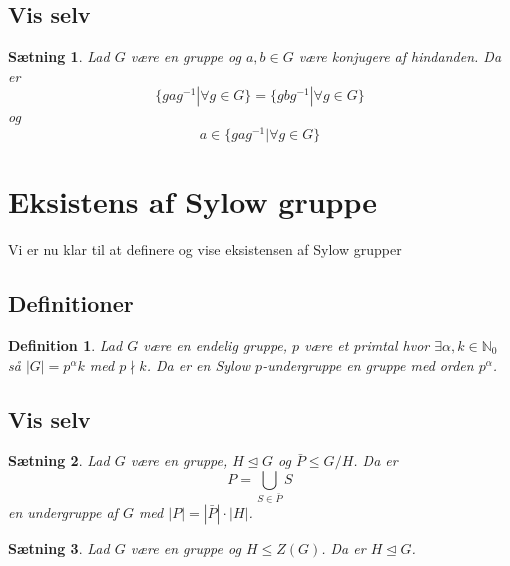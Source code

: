 \documentclass{article}
\newcommand{\N}{\mathbb{N}}
\newcommand{\inv}{^{-1}}
\newtheorem{setn}{Sætning}
\newtheorem{defi}{Definition}
\begin{document}
		\subsection*{Vis selv}
		\begin{setn} \label{KonjPar}
			Lad $G$ være en gruppe og $a,b \in G$ være konjugere af hindanden.
			Da er
			$$\{gag\inv | \forall g \in G\} = \{gbg\inv | \forall g \in G\}$$
			og
			$$a \in \{gag\inv | \forall g \in G\}$$
		\end{setn}
	\newpage
	\section*{Eksistens af Sylow gruppe}
		Vi er nu klar til at definere og vise eksistensen af Sylow grupper
		\subsection*{Definitioner}
		\begin{defi}
			Lad $G$ være en endelig gruppe, $p$ være et primtal hvor $\exists \alpha,k \in \N_0$ så
			$|G| = p^\alpha k$ med $p \nmid k$. Da er en Sylow $p$-undergruppe en gruppe med
			orden $p^\alpha$.
		\end{defi}
		\subsection*{Vis selv}
		\begin{setn} \label{UndGrupOp}
			Lad $G$ være en gruppe, $H \unlhd G$ og $\bar{P} \le G/H$.
			Da er
			$$P = \bigcup_{S \in \bar{P}}S$$
			en undergruppe af $G$ med
			$|P| = |\bar{P}|\cdot|H|$.
		\end{setn}
		\begin{setn}
			Lad $G$ være en gruppe og $H \le Z(G)$. Da er $H \unlhd G$.
		\end{setn}
\end{document}

